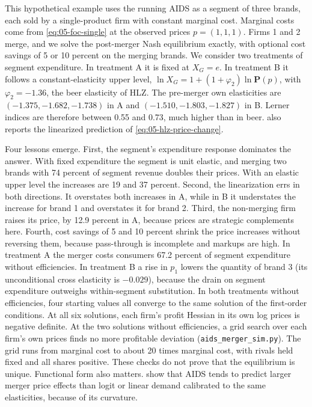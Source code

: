 \begin{example}\label{ex:05-merger-sim}
This hypothetical example uses the running AIDS as a segment of three brands, each sold by a single-product firm
with constant marginal cost. Marginal costs come from \eqref{eq:05-foc-single} at the observed prices
$p = (1,1,1)$. Firms 1 and 2 merge, and we solve the post-merger Nash equilibrium exactly, with optional cost
savings of 5 or 10 percent on the merging brands. We consider two treatments of segment expenditure. In
treatment A it is fixed at $X_G = e$. In treatment B it follows a constant-elasticity upper level,
$\ln X_G = 1 + (1 + \varphi_2)\ln\mathbf{P}(p)$, with $\varphi_2 = -1.36$, the beer elasticity of HLZ. The
pre-merger own elasticities are $(-1.375, -1.682, -1.738)$ in A and $(-1.510, -1.803, -1.827)$ in B. Lerner
indices are therefore between 0.55 and 0.73, much higher than in beer.  also reports
the linearized prediction of \eqref{eq:05-hlz-price-change}.

Four lessons emerge. First, the segment's expenditure response dominates the answer. With fixed expenditure the
segment is unit elastic, and merging two brands with 74 percent of segment revenue doubles their prices. With an
elastic upper level the increases are 19 and 37 percent. Second, the linearization errs in both directions. It
overstates both increases in A, while in B it understates the increase for brand 1 and overstates it for
brand 2. Third, the non-merging firm raises its price, by 12.9 percent in A, because prices are strategic
complements here. Fourth, cost savings of 5 and 10 percent shrink the price increases without reversing them,
because pass-through is incomplete and markups are high. In treatment A the merger costs consumers 67.2 percent of
segment expenditure without efficiencies. In treatment B a rise in $p_1$ lowers the quantity of brand 3 (its
unconditional cross elasticity is $-0.029$), because the drain on segment expenditure outweighs within-segment
substitution. In both treatments without efficiencies, four starting values all converge to the same solution
of the first-order conditions. At all six solutions, each firm's profit Hessian in its own log prices is negative
definite. At the two solutions without efficiencies, a grid search over each firm's own prices finds no more
profitable deviation (\texttt{aids\_merger\_sim.py}). The grid runs from marginal cost to about 20 times marginal
cost, with rivals held fixed and all shares positive. These checks do not prove that the equilibrium is unique.
Functional form also matters. \citet{CrookeEtAl1999} show that AIDS tends to
predict larger merger price effects than logit or linear demand calibrated to the same elasticities, because of
its curvature.
\end{example}


